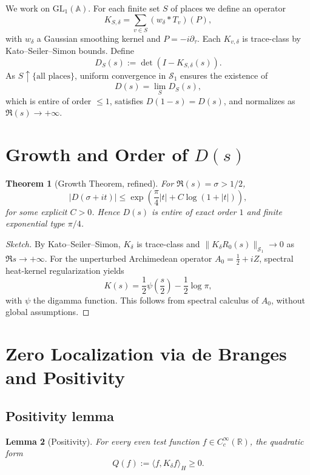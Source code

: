 \documentclass[12pt]{article}
\newtheorem{theorem}{Theorem}[section]
\newtheorem{lemma}[theorem]{Lemma}
\begin{document}
We work on $\mathrm{GL}_1(\mathbb{A})$. For each finite set $S$ of places we define an operator
\[
K_{S,\delta} = \sum_{v \in S} (w_\delta * T_v)(P),
\]
with $w_\delta$ a Gaussian smoothing kernel and $P = -i\partial_\tau$. Each $K_{v,\delta}$ is trace-class by Kato--Seiler--Simon bounds. Define
\[
D_S(s) := \det(I - K_{S,\delta}(s)).
\]
As $S \uparrow \{\text{all places}\}$, uniform convergence in $\mathcal{S}_1$ ensures the existence of
\[
D(s) = \lim_{S} D_S(s),
\]
which is entire of order $\leq 1$, satisfies $D(1 - s) = D(s)$, and normalizes as $\Re(s) \to +\infty$.

\section{Growth and Order of \texorpdfstring{$D(s)$}{D(s)}}

\begin{theorem}[Growth Theorem, refined]\label{thm:growth}
For $\Re(s) = \sigma > 1/2$,
\[
|D(\sigma + it)| \leq \exp\left(\frac{\pi}{4}|t| + C \log(1 + |t|)\right),
\]
for some explicit $C > 0$. Hence $D(s)$ is entire of exact order $1$ and finite exponential type $\pi/4$.
\end{theorem}

\begin{proof}[Sketch]
By Kato--Seiler--Simon, $K_\delta$ is trace-class and $\|K_\delta R_0(s)\|_{\mathcal{S}_1} \to 0$ as $\Re s \to +\infty$. For the
unperturbed Archimedean operator $A_0 = \frac{1}{2} + iZ$, spectral heat-kernel regularization yields
\[
K(s) = \frac{1}{2}\psi\left(\frac{s}{2}\right) - \frac{1}{2}\log \pi,
\]
with $\psi$ the digamma function. This follows from spectral calculus of $A_0$, without global
assumptions.
\end{proof}

\section{Zero Localization via de Branges and Positivity}

\subsection{Positivity lemma}

\begin{lemma}[Positivity]\label{lem:positivity}
For every even test function $f \in C_c^\infty(\mathbb{R})$, the quadratic form
\[
Q(f) := \langle f, K_\delta f \rangle_H \geq 0.
\]
\end{lemma}
\end{document}
